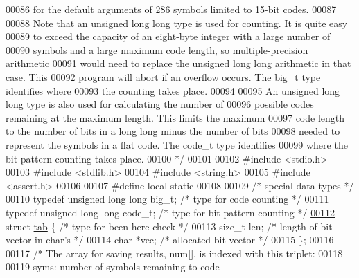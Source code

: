 \begin{DoxyCode}
00086 \textcolor{comment}{   for the default arguments of 286 symbols limited to 15-bit codes.}
00087 \textcolor{comment}{}
00088 \textcolor{comment}{   Note that an unsigned long long type is used for counting.  It is quite easy}
00089 \textcolor{comment}{   to exceed the capacity of an eight-byte integer with a large number of}
00090 \textcolor{comment}{   symbols and a large maximum code length, so multiple-precision arithmetic}
00091 \textcolor{comment}{   would need to replace the unsigned long long arithmetic in that case.  This}
00092 \textcolor{comment}{   program will abort if an overflow occurs.  The big\_t type identifies where}
00093 \textcolor{comment}{   the counting takes place.}
00094 \textcolor{comment}{}
00095 \textcolor{comment}{   An unsigned long long type is also used for calculating the number of}
00096 \textcolor{comment}{   possible codes remaining at the maximum length.  This limits the maximum}
00097 \textcolor{comment}{   code length to the number of bits in a long long minus the number of bits}
00098 \textcolor{comment}{   needed to represent the symbols in a flat code.  The code\_t type identifies}
00099 \textcolor{comment}{   where the bit pattern counting takes place.}
00100 \textcolor{comment}{ */}
00101 
00102 \textcolor{preprocessor}{#include <stdio.h>}
00103 \textcolor{preprocessor}{#include <stdlib.h>}
00104 \textcolor{preprocessor}{#include <string.h>}
00105 \textcolor{preprocessor}{#include <assert.h>}
00106 
00107 \textcolor{preprocessor}{#define local static}
00108 
00109 \textcolor{comment}{/* special data types */}
00110 \textcolor{keyword}{typedef} \textcolor{keywordtype}{unsigned} \textcolor{keywordtype}{long} \textcolor{keywordtype}{long} big\_t;   \textcolor{comment}{/* type for code counting */}
00111 \textcolor{keyword}{typedef} \textcolor{keywordtype}{unsigned} \textcolor{keywordtype}{long} \textcolor{keywordtype}{long} code\_t;  \textcolor{comment}{/* type for bit pattern counting */}
\hyperlink{structtab}{00112} \textcolor{keyword}{struct }\hyperlink{structtab}{tab} \{                        \textcolor{comment}{/* type for been here check */}
00113     \textcolor{keywordtype}{size\_t} len;         \textcolor{comment}{/* length of bit vector in char's */}
00114     \textcolor{keywordtype}{char} *vec;          \textcolor{comment}{/* allocated bit vector */}
00115 \};
00116 
00117 \textcolor{comment}{/* The array for saving results, num[], is indexed with this triplet:}
00118 \textcolor{comment}{}
00119 \textcolor{comment}{      syms: number of symbols remaining to code}

\end{DoxyCode}
